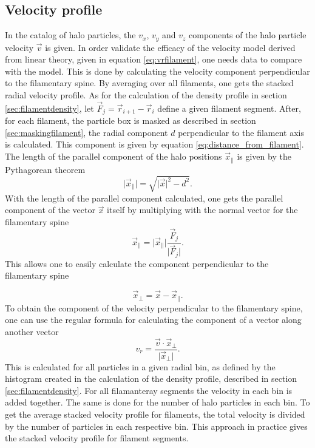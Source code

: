 \subsection{Velocity profile}\label{sec:numfilamentvelocity}
In the catalog of halo particles, the $v_x$,
$v_y$ and $v_z$ components of the halo particle velocity $\vec{v}$ is given. In order validate the efficacy of
the velocity model derived from linear theory, given in equation \ref{eq:vrfilament}, one
needs data to compare with the model. This is done by calculating the velocity component perpendicular to the filamentary spine. By averaging over all filaments, one gets the
stacked radial velocity profile. As for the calculation of the density profile in section
\ref{sec:filamentdensity}, let $\vec{F}_j=\vec{r}_{i+1} - \vec{r}_i$ define a given
filament segment. After, for each filament, the particle box is masked as
described in section \ref{sec:maskingfilament}, the radial component $d$
perpendicular to the filament axis is calculated. This component is given by equation \ref{eq:distance_from_filament}. The length of the parallel component of the
halo positions $\vec{x}_\parallel$ is given by the Pythagorean theorem
\begin{equation}
    \vert\vec{x}_\parallel\vert=\sqrt{\vert \vec{x}\vert^2-d^2}.
\end{equation}
With the length of the parallel component calculated, one gets the parallel component of the vector $\vec{x}$ itself
by multiplying with the normal vector for the filamentary spine
\begin{equation}
    \vec{x}_\parallel=\vert\vec{x}_\parallel\vert\frac{\vec{F}_j}{\vert\vec{F}_j\vert}.
\end{equation}
This allows one to easily calculate the component perpendicular to the filamentary spine

\begin{equation}
    \vec{x}_\perp=\vec{x}-\vec{x}_\parallel.
\end{equation}
To obtain the component of the velocity perpendicular to the filamentary spine, one
can use the regular formula for calculating the component of a vector along
another vector
\begin{equation}
    v_r=\frac{\vec{v}\cdot\vec{x}_\perp}{\vert\vec{x}_\perp\vert}.
\end{equation}
This is calculated for all particles in a given radial bin, as defined by the
histogram created in the calculation of the density profile, described in section
\ref{sec:filamentdensity}. For all filamanteray segments the velocity in each bin is added together. The same is done for the number of halo particles in each bin. To get the average stacked velocity profile for filaments, the total velocity is divided by the number of particles in each respective bin. This approach in practice gives the stacked velocity profile for filament segments.
